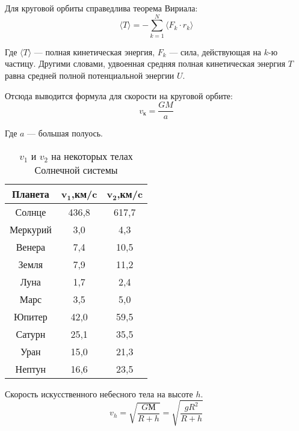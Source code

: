 Для круговой орбиты справедлива теорема Вириала:
\begin{equation}
\langle T\rangle =-\sum _{{k=1}}^{N}\langle {F}_{k}\cdot {r}_{k}\rangle
\end{equation}

Где $\langle T\rangle$ --- полная кинетическая энергия, $F_k$ --- сила, действующая на $k$-ю частицу. Другими словами, удвоенная средняя полная кинетическая энергия $T$ равна средней полной потенциальной энергии $U$.

Отсюда выводится формула для скорости на круговой орбите:
\begin{equation}
v_{\text{к}}=\frac{GM}{a}
\end{equation}

Где $a$ --- большая полуось.

\begin{table}[h!]
\centering
\begin{tabular}{|c|c|c|}
\hline
\textbf{Планета} & $\mathbf{v_1}$,\textbf{км/c} & $\mathbf{v_2}$,\textbf{км/c}\\
\hline
Солнце & 436,8 & 617,7\\
\hline
Меркурий & 3,0 & 4,3\\
\hline
Венера & 7,4 & 10,5\\
\hline
Земля & 7,9 & 11,2\\
\hline
Луна & 1,7 & 2,4\\
\hline
Марс & 3,5 & 5,0\\
\hline
Юпитер & 42,0 & 59,5\\
\hline
Сатурн & 25,1 & 35,5\\
\hline
Уран & 15,0 & 21,3\\
\hline
Нептун & 16,6 & 23,5\\
\hline
\end{tabular}
\caption{$v_1$ и $v_2$ на некоторых телах Солнечной системы}
\end{table}

Скорость искусственного небесного тела на высоте $h$.\begin{equation}v_h=\sqrt{\frac{GМ}{R+h}}=\sqrt{\frac{gR^2}{R+h}}
\end{equation}


